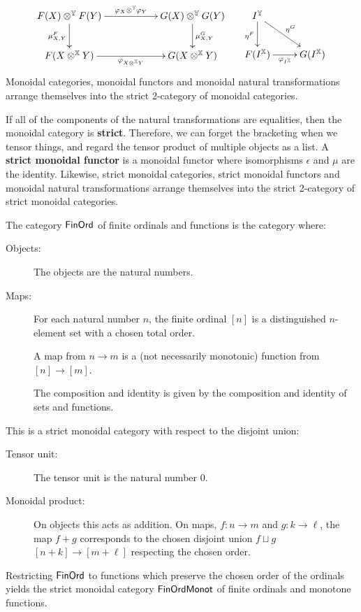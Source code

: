 \begin{definition}
$$
\xymatrix{
  F(X)\otimes^\Y F(Y) \ar[rr]^{\phi_X\otimes^\Y \phi_Y} \ar[d]_{\mu^F_{X,Y}}
   && G(X)\otimes^\Y G(Y) \ar[d]^{\mu^G_{X,Y}}
 \\F(X\otimes^\X Y) \ar[rr]_{\phi_{X\otimes^\X Y}}
   && G(X\otimes^\X Y)
}
\hspace*{.5cm}
\xymatrix{
I^\Y \ar[dr]^{\eta^G} \ar[d]_{\eta^F}
\\ F(I^\X) \ar[r]_{\phi_{I^\X}}
  &G(I^\X)
}
$$
Monoidal categories, monoidal functors and monoidal natural transformations arrange themselves into the strict 2-category of monoidal categories. 
\end{definition}
If all of the components of the natural transformations are equalities, then the monoidal category is {\bf strict}.  Therefore, we can forget the bracketing when we tensor things, and regard the tensor product of multiple objects as a list.
A {\bf strict monoidal functor} is a monoidal functor where isomorphisms $\epsilon$ and $\mu$ are the identity.
Likewise, strict monoidal categories, strict monoidal functors and monoidal natural transformations arrange themselves into the strict 2-category of strict monoidal categories.
\begin{example}
The category $\mathsf{FinOrd}$ of finite ordinals and functions is the category where:
\begin{description}
\item[Objects:] The objects are the natural numbers.
\item[Maps:]
For each natural number $n$, the finite ordinal $[n]$ is a distinguished $n$-element set with a chosen total order.

A map from $n\to m$ is a (not necessarily monotonic) function from $[n]\to [m]$.

The composition and identity is given by the composition and identity of sets and functions.
\end{description}
This is a strict monoidal category with respect to the disjoint union:
\begin{description}
\item[Tensor unit:] The tensor unit is the natural number 0.
\item[Monoidal product:]
On objects this acts as addition.  On maps, $f:n\to m$ and $g:k\to \ell$, the map $f+g$  corresponds to the chosen disjoint union $f\sqcup g$ $[n+k]\to [m+\ell]$ respecting the chosen order.
\end{description}
%
%
Restricting $\mathsf{FinOrd}$ to functions which preserve the chosen order of the ordinals yields the strict monoidal category $\mathsf{FinOrdMonot}$ of finite ordinals and monotone functions.
\end{example}

